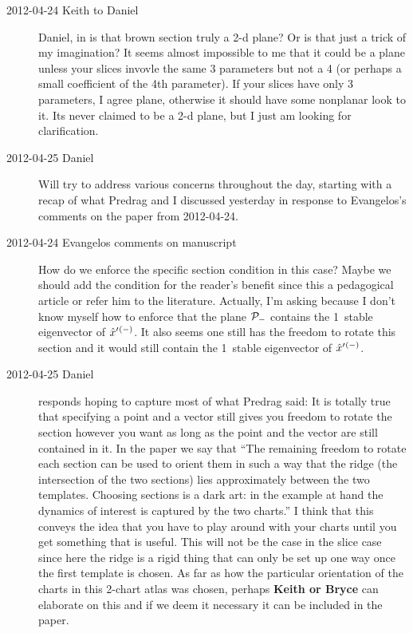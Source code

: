 \begin{description}
\item[2012-04-24 Keith to Daniel]  Daniel, in  is
that brown section truly a 2-d plane?  Or is that just a trick of my
imagination?  It seems almost impossible to me that it could be a plane
unless your slices invovle the same 3 parameters but not a 4 (or perhaps
a small coefficient of the 4th parameter). If your slices have only 3
parameters, I agree plane, otherwise it should have some nonplanar look
to it.  Its never claimed to be a 2-d plane, but I just am looking for
clarification.

\item[2012-04-25 Daniel] Will try to address various concerns throughout
the day, starting with a recap of what Predrag and I discussed yesterday
in response to Evangelos's comments on the paper from 2012-04-24.

\item[2012-04-24 Evangelos comments on manuscript]
How do we enforce the specific section condition in this case?
Maybe we should add the condition for the reader's benefit since this
a pedagogical article or refer him to the literature. Actually, I'm asking
because I don't know myself how to
enforce that the plane ${\cal P}_{-}$ contains the 1\dmn\
stable eigenvector of ${\hat{x}'}{}^{(-)}$. It also seems one still has
the freedom to rotate this section and it would still contain
the 1\dmn\ stable eigenvector of ${\hat{x}'}{}^{(-)}$.

\item[2012-04-25 Daniel] responds hoping to capture most of what Predrag
said: It is totally true that specifying a point and a vector still gives
you freedom to rotate the section however you want as long as the point
and the vector are still contained in it. In the paper we say that ``The
remaining freedom to rotate each section can be used to orient them in
such a way that the ridge (the intersection of the two sections) lies
approximately between the two templates. Choosing sections is a dark art:
in the example at hand the dynamics of interest is captured by the two
charts.'' I think that this conveys the idea that you have to play around
with your charts until you get something that is useful. This will not be
the case in the slice case since here the ridge is a rigid thing that can
only be set up one way once the first template is chosen. As far as how
the particular orientation of the charts in this 2-chart atlas was
chosen, perhaps {\bf Keith or Bryce} can elaborate on this and if we deem
it necessary it can be included in the paper.


\end{description}
